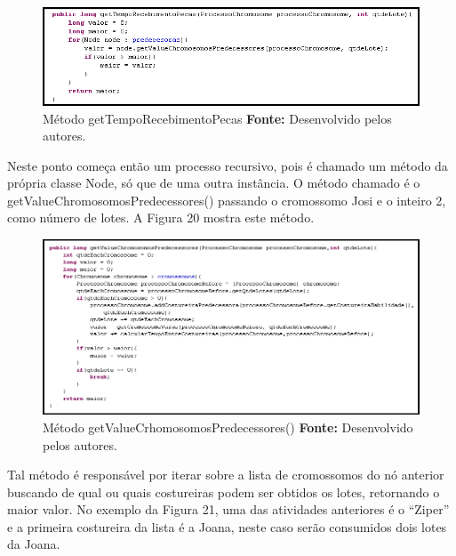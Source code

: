 \begin{figure}[h!]
	\centerline{\includegraphics[scale=0.8]{./imagens/metodo_getTempoRecebimentoPecas.png}}
	\caption[Distribuição de trabalho]
	{Método getTempoRecebimentoPecas \textbf{Fonte:} Desenvolvido pelos autores.}
	\label{fig:exemplo1}
\end{figure}

\newpage

\par Neste ponto começa então um processo recursivo, pois é chamado um método da
própria classe Node, só que de uma outra instância.
O método chamado é o getValueChromosomosPredecessores() passando o cromossomo
Josi e o inteiro 2, como número de lotes.
A Figura 20 mostra este método.

\begin{figure}[h!]
	\centerline{\includegraphics[scale=0.7]{./imagens/metodo_getValueCrhomosomosPredecessores.png}}
	\caption[Distribuição de trabalho]
	{Método getValueCrhomosomosPredecessores() \textbf{Fonte:} Desenvolvido pelos
	autores.}
	\label{fig:exemplo1}
\end{figure}

\par Tal método é responsável por iterar sobre a lista de cromossomos do nó anterior buscando de qual ou quais costureiras 
podem ser obtidos os lotes, retornando o maior valor. No exemplo da Figura 21,
uma das atividades anteriores é o ``Ziper'' e a primeira costureira da lista é a Joana, neste caso serão consumidos dois lotes
da Joana.

\newpage


